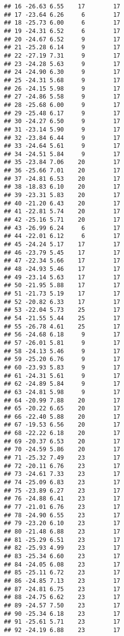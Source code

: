 \documentclass[
]{article}
\begin{document}
\begin{verbatim}
## 16 -26.63 6.55    17        17
## 17 -23.64 6.26     6        17
## 18 -25.73 6.00     6        17
## 19 -24.31 6.52     6        17
## 20 -24.67 6.52     9        17
## 21 -25.28 6.14     9        17
## 22 -27.19 7.31     9        17
## 23 -24.28 5.63     9        17
## 24 -24.90 6.30     9        17
## 25 -24.31 5.68     9        17
## 26 -24.15 5.98     9        17
## 27 -24.86 5.58     9        17
## 28 -25.68 6.00     9        17
## 29 -25.48 6.17     9        17
## 30 -24.27 6.50     9        17
## 31 -23.14 5.90     9        17
## 32 -23.84 6.44     9        17
## 33 -24.64 5.61     9        17
## 34 -24.51 5.84     9        17
## 35 -23.84 7.06    20        17
## 36 -25.66 7.01    20        17
## 37 -24.81 6.53    20        17
## 38 -18.83 6.10    20        17
## 39 -23.31 5.83    20        17
## 40 -21.20 6.43    20        17
## 41 -22.81 5.74    20        17
## 42 -25.16 5.71    20        17
## 43 -26.99 6.24     6        17
## 44 -22.01 6.12     6        17
## 45 -24.24 5.17    17        17
## 46 -23.79 5.45    17        17
## 47 -22.34 5.66    17        17
## 48 -24.93 5.46    17        17
## 49 -23.14 5.63    17        17
## 50 -21.95 5.88    17        17
## 51 -21.73 5.19    17        17
## 52 -20.82 6.33    17        17
## 53 -22.04 5.73    25        17
## 54 -21.55 5.44    25        17
## 55 -26.78 4.61    25        17
## 56 -24.68 6.18     9        17
## 57 -26.01 5.81     9        17
## 58 -24.13 5.46     9        17
## 59 -25.20 6.76     9        17
## 60 -23.93 5.83     9        17
## 61 -24.31 5.61     9        17
## 62 -24.89 5.84     9        17
## 63 -24.81 5.98     9        17
## 64 -20.99 7.88    20        17
## 65 -20.22 6.65    20        17
## 66 -22.40 5.88    20        17
## 67 -19.53 6.56    20        17
## 68 -22.22 6.18    20        17
## 69 -20.37 6.53    20        17
## 70 -24.59 5.86    20        17
## 71 -25.32 7.49    23        17
## 72 -20.11 6.76    23        17
## 73 -24.61 7.33    23        17
## 74 -25.09 6.83    23        17
## 75 -23.89 6.27    23        17
## 76 -24.88 6.41    23        17
## 77 -21.01 6.76    23        17
## 78 -24.90 6.55    23        17
## 79 -23.20 6.10    23        17
## 80 -21.48 6.88    23        17
## 81 -25.29 6.51    23        17
## 82 -25.93 4.99    23        17
## 83 -25.34 6.60    23        17
## 84 -24.05 6.08    23        17
## 85 -25.11 6.72    23        17
## 86 -24.85 7.13    23        17
## 87 -24.81 6.75    23        17
## 88 -24.75 6.62    23        17
## 89 -24.57 7.50    23        17
## 90 -25.34 6.18    23        17
## 91 -25.61 5.71    23        17
## 92 -24.19 6.88    23        17

\end{verbatim}
\end{document}
